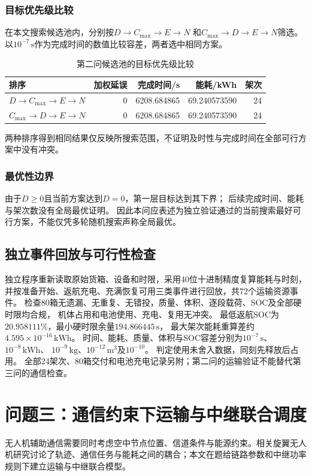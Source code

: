 \documentclass[bwprint]{gmcmthesis}
\begin{document}
\subsubsection{目标优先级比较}
在本文搜索候选池内，分别按$D\rightarrow C_{\max}\rightarrow E\rightarrow N$
和$C_{\max}\rightarrow D\rightarrow E\rightarrow N$筛选。
以$10^{-7}\,\mathrm{s}$作为完成时间的数值比较容差，两者选中相同方案。
\begin{table}[htbp]
\centering
\small
\caption{第二问候选池的目标优先级比较}
\label{tab:q2_priority}
\begin{tabular}{lrrrr}
\toprule
排序 & 加权延误 & 完成时间/s & 能耗/kWh & 架次 \\
\midrule
$D\to C_{\max}\to E\to N$ & 0 & 6208.684865 & 69.240573590 & 24 \\
$C_{\max}\to D\to E\to N$ & 0 & 6208.684865 & 69.240573590 & 24 \\
\bottomrule
\end{tabular}
\end{table}

两种排序得到相同结果仅反映所搜索范围，不证明及时性与完成时间在全部可行方案中没有冲突。

\subsubsection{最优性边界}
由于$D\geq0$且当前方案达到$D=0$，第一层目标达到其下界；
后续完成时间、能耗与架次数没有全局最优证明。
因此本问应表述为独立验证通过的当前搜索最好可行方案，不能仅凭多轮随机搜索声称全局最优。

\subsection{独立事件回放与可行性检查}
独立程序重新读取原始货箱、设备和时限，采用40位十进制精度复算能耗与时刻，
并按准备开始、返航充电、充满恢复可用三类事件进行回放，共72个运输资源事件。
检查80箱无遗漏、无重复、无错投，质量、体积、逐段载荷、SOC及全部硬时限均合规，
机体占用和电池使用、充电、复用无冲突。
最低返航SOC为$20.958111\%$，最小硬时限余量$194.866445\,\mathrm{s}$，
最大架次能耗重算差约$4.595\times10^{-16}\,\mathrm{kWh}$。
时间、能耗、质量、体积与SOC容差分别为$10^{-7}\,\mathrm{s}$、$10^{-8}\,\mathrm{kWh}$、
$10^{-9}\,\mathrm{kg}$、$10^{-12}\,\mathrm{m^3}$及$10^{-10}$。
判定使用未舍入数据，同刻先释放后占用。
全部24架次、80箱交付和电池充电记录另附；第二问的运输验证不能替代第三问的通信检查。

\section{问题三：通信约束下运输与中继联合调度}
无人机辅助通信需要同时考虑空中节点位置、信道条件与能源约束\cite{zeng2016}。相关旋翼无人机研究讨论了轨迹、通信任务与能耗之间的耦合\cite{zeng2019}；本文在题给链路参数和中继功率规则下建立运输与中继联合模型。
\end{document}
